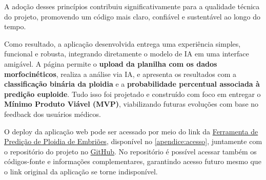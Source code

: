 A adoção desses princípios contribuiu significativamente para a qualidade técnica do projeto, promovendo um código mais claro, confiável e sustentável ao longo do tempo.

Como resultado, a aplicação desenvolvida entrega uma experiência simples, funcional e robusta, integrando diretamente o modelo de IA em uma interface amigável. A página permite o \textbf{upload da planilha com os dados morfocinéticos}, realiza a análise via IA, e apresenta os resultados com a \textbf{classificação binária da ploidia} e a \textbf{probabilidade percentual associada à predição euploide}. Tudo isso foi projetado e construído com foco em entregar o \textbf{Mínimo Produto Viável (MVP)}, viabilizando futuras evoluções com base no feedback dos usuários médicos.

O deploy da aplicação web pode ser acessado por meio do link da \href{https://embryo-predictor.vercel.app}{Ferramenta de Predição de Ploidia de Embriões}, disponível no \autoref{apendice:acesso}, juntamente com o repositório do projeto no \href{https://github.com/CedisUnB/embryo-predictor}{GitHub}. No repositório é possível acessar também os códigos-fonte e informações complementares, garantindo acesso futuro mesmo que o link original da aplicação se torne indisponível.